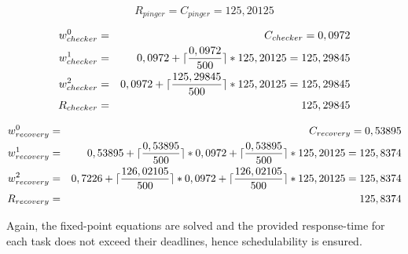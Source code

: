 \begin{equation}
\label{eq:pingerrta}
     R_{pinger} = C_{pinger} = 125,20125
\end{equation}

\begin{eqnarray}
    w_{checker}^0 &=& C_{checker} = 0,0972 \nonumber \\ 
    w_{checker}^1 &=& 0,0972 + \lceil\frac{0,0972}{500}\rceil*125,20125 = 125,29845 \nonumber \\ 
    w_{checker}^2 &=& 0,0972 + \lceil\frac{125,29845}{500}\rceil*125,20125 = 125,29845 \nonumber \\
    R_{checker} &=& 125,29845
\end{eqnarray}

\begin{eqnarray}
    w_{recovery}^0 &=& C_{recovery} = 0,53895 \nonumber \\ 
    w_{recovery}^1 &=& 0,53895 + \lceil\frac{0,53895}{500}\rceil*0,0972 + \lceil\frac{0,53895}{500}\rceil*125,20125 = 125,8374 \nonumber \\ 
    w_{recovery}^2 &=& 0,7226 + \lceil\frac{126,02105}{500}\rceil*0,0972 + \lceil\frac{126,02105}{500}\rceil*125,20125 = 125,8374 \nonumber \\
    R_{recovery} &=& 125,8374
\end{eqnarray}

Again, the fixed-point equations are solved and the provided response-time for each task does not exceed their deadlines, hence schedulability is ensured.


